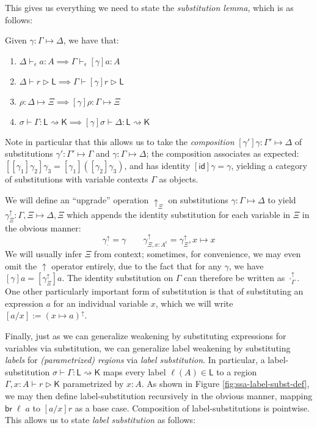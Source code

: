 \documentclass[acmsmall,screen,review]{acmart}
\newcounter{todos}
\newcommand{\todo}[1]{\stepcounter{todos} \textcolor{red}{TODO \arabic{todos}: #1}}
\newcommand{\ms}[1]{\ensuremath{\mathsf{#1}}}
\newcommand{\upg}[1]{{#1}^\uparrow}
\newcommand{\thyp}[3]{#1 : {#2}^{#3}}
\newcommand{\hasty}[4]{#1 \vdash_{#2} #3: {#4}}
\newcommand{\haslb}[3]{#1 \vdash #2 \rhd #3}
\newcommand{\issubst}[3]{#1: #2 \mapsto #3}
\newcommand{\lbsubst}[4]{#1 \vdash #2: #3 \rightsquigarrow #4}
\begin{document}
This gives us everything we need to state the \emph{substitution lemma}, which
is as follows:
\begin{lemma}[Substitution]
  Given $\issubst{\gamma}{\Gamma}{\Delta}$, we have that:
  \begin{enumerate}[label=(\alph*)]
    \item $\hasty{\Delta}{\epsilon}{a}{A} \implies \hasty{\Gamma}{\epsilon}{[\gamma]a}{A}$ 
    \item $\haslb{\Delta}{r}{\ms{L}} \implies \haslb{\Gamma}{[\gamma]r}{\ms{L}}$
    \item $\issubst{\rho}{\Delta}{\Xi} \implies \issubst{[\gamma]\rho}{\Gamma}{\Xi}$
    \item $\lbsubst{\sigma}{\Gamma}{\ms{L}}{\ms{K}} \implies \lbsubst{[\gamma]\sigma}{\Delta}{\ms{L}}{\ms{K}}$
  \end{enumerate}
\end{lemma}
Note in particular that this allows us to take the \emph{composition}
$\issubst{[\gamma']\gamma}{\Gamma'}{\Delta}$ of substitutions $\issubst{\gamma'}{\Gamma'}{\Gamma}$
and $\issubst{\gamma}{\Gamma}{\Delta}$; the composition associates as expected:
$[[\gamma_1]\gamma_2]\gamma_3 = [\gamma_1]([\gamma_2]\gamma_3)$, and has identity $[\ms{id}]\gamma =
\gamma$, yielding a category of substitutions with variable contexts $\Gamma$ as objects.

We will define an ``upgrade'' operation $\uparrow_\Xi$ on substitutions
$\issubst{\gamma}{\Gamma}{\Delta}$ to yield $\issubst{\upg{\gamma}_{\Xi}}{\Gamma, \Xi}{\Delta, \Xi}$
which appends the identity substitution for each variable in $\Xi$ in the obvious manner:
\begin{equation}
  \upg{\gamma}_{\cdot} = \gamma \qquad 
  \upg{\gamma}_{\Xi, \thyp{x}{A}{\epsilon}} = \upg{\gamma}_{\Xi}, x \mapsto x
\end{equation}
We will usually infer $\Xi$ from context; sometimes, for convenience, we may even omit the
$\uparrow$ operator entirely, due to the fact that for any $\gamma$, we have $[\gamma]a =
[\upg{\gamma}_\Xi]a$. The identity substitution on $\Gamma$ can therefore be written as
$\upg{\cdot}_{\Gamma}$. One other particularly important form of substitution is that of
substituting an expression $a$ for an individual variable $x$, which we will write $[a/x] := \upg{(x
\mapsto a)}$.

Finally, just as we can generalize weakening by substituting expressions for variables via
substitution, we can generalize label weakening by substituting \emph{labels} for
\emph{(parametrized) regions} via \emph{label substitution}. In particular, a label-substitution
$\lbsubst{\sigma}{\Gamma}{\ms{L}}{\ms{K}}$ maps every label $\ell(A) \in \ms{L}$ to a region
$\haslb{\Gamma, x : A}{r}{\ms{K}}$ parametrized by $x : A$. As shown in Figure
\ref{fig:ssa-label-subst-def}, we may then define label-substitution recursively in the obvious
manner, mapping $\ms{br}\;\ell\;a$ to $[a/x]r$ as a base case. Composition of label-substitutions is
pointwise. This allows us to state \emph{label substitution} as follows:
\end{document}
